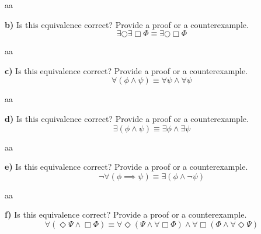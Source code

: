 \documentclass[titlepage, letterpaper, fleqn]{article}
\begin{document}
aa

{\large \textbf{b)} Is this equivalence correct? Provide a proof or a counterexample.
\[\exists \bigcirc \exists \Box \Phi \equiv \exists \bigcirc \Box \Phi\]}

aa

{\large \textbf{c)} Is this equivalence correct? Provide a proof or a counterexample.
\[\forall (\phi \wedge \psi) \equiv \forall \psi \wedge \forall \psi\]}

aa

{\large \textbf{d)} Is this equivalence correct? Provide a proof or a counterexample.
\[\exists (\phi \wedge \psi) \equiv \exists \phi \wedge \exists \psi\]}

aa

{\large \textbf{e)} Is this equivalence correct? Provide a proof or a counterexample.
\[\neg \forall(\phi \implies \psi) \equiv \exists (\phi \wedge \neg \psi)\]}

aa

{\large \textbf{f)} Is this equivalence correct? Provide a proof or a counterexample.
\[\forall (\Diamond \Psi \wedge \Box \Phi) \equiv \forall \Diamond (\Psi \wedge \forall \Box \Phi) \wedge \forall \Box (\Phi \wedge \forall \Diamond \Psi)\]}
\end{document}
